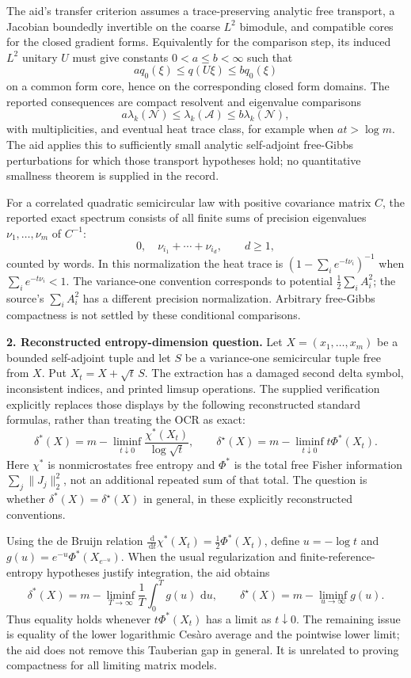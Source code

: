 \documentclass[11pt]{article}
\newcommand{\dd}{\,\mathrm{d}}
\begin{document}
The aid's transfer criterion assumes a trace-preserving analytic free transport, a Jacobian boundedly invertible on the coarse \(L^2\) bimodule, and compatible cores for the closed gradient forms. Equivalently for the comparison step, its induced \(L^2\) unitary \(U\) must give constants \(0<a\le b<\infty\) such that
\[
 a q_0(\xi)\le q(U\xi)\le b q_0(\xi)
\]
on a common form core, hence on the corresponding closed form domains. The reported consequences are compact resolvent and eigenvalue comparisons
\[
 a\lambda_k(\mathcal N)\le\lambda_k(\mathcal A)
                    \le b\lambda_k(\mathcal N),
\]
with multiplicities, and eventual heat trace class, for example when \(at>\log m\). The aid applies this to sufficiently small analytic self-adjoint free-Gibbs perturbations for which those transport hypotheses hold; no quantitative smallness theorem is supplied in the record.

For a correlated quadratic semicircular law with positive covariance matrix \(C\), the reported exact spectrum consists of all finite sums of precision eigenvalues \(\nu_1,\ldots,\nu_m\) of \(C^{-1}\):
\[
 0,\quad\nu_{i_1}+\cdots+\nu_{i_d},\qquad d\ge1,
\]
counted by words. In this normalization the heat trace is \((1-\sum_i e^{-t\nu_i})^{-1}\) when \(\sum_i e^{-t\nu_i}<1\). The variance-one convention corresponds to potential \(\tfrac12\sum_iA_i^2\); the source's \(\sum_iA_i^2\) has a different precision normalization. Arbitrary free-Gibbs compactness is not settled by these conditional comparisons.

\textbf{2. Reconstructed entropy-dimension question.} Let \(X=(x_1,\ldots,x_m)\) be a bounded self-adjoint tuple and let \(S\) be a variance-one semicircular tuple free from \(X\). Put \(X_t=X+\sqrt t\,S\). The extraction has a damaged second delta symbol, inconsistent indices, and printed limsup operations. The supplied verification explicitly replaces those displays by the following reconstructed standard formulas, rather than treating the OCR as exact:
\[
 \delta^*(X)=m-\liminf_{t\downarrow0}
          \frac{\chi^*(X_t)}{\log\sqrt t},\qquad
 \delta^\star(X)=m-\liminf_{t\downarrow0}t\Phi^*(X_t).
\]
Here \(\chi^*\) is nonmicrostates free entropy and \(\Phi^*\) is the total free Fisher information \(\sum_j\|J_j\|_2^2\), not an additional repeated sum of that total. The question is whether \(\delta^*(X)=\delta^\star(X)\) in general, in these explicitly reconstructed conventions.

Using the de Bruijn relation \(\frac{\dd}{\dd t}\chi^*(X_t)=\tfrac12\Phi^*(X_t)\), define \(u=-\log t\) and \(g(u)=e^{-u}\Phi^*(X_{e^{-u}})\). When the usual regularization and finite-reference-entropy hypotheses justify integration, the aid obtains
\[
 \delta^*(X)=m-\liminf_{T\to\infty}\frac1T\int_0^Tg(u)\,\dd u,
 \qquad
 \delta^\star(X)=m-\liminf_{u\to\infty}g(u).
\]
Thus equality holds whenever \(t\Phi^*(X_t)\) has a limit as \(t\downarrow0\). The remaining issue is equality of the lower logarithmic Ces\`aro average and the pointwise lower limit; the aid does not remove this Tauberian gap in general. It is unrelated to proving compactness for all limiting matrix models.
\end{document}
